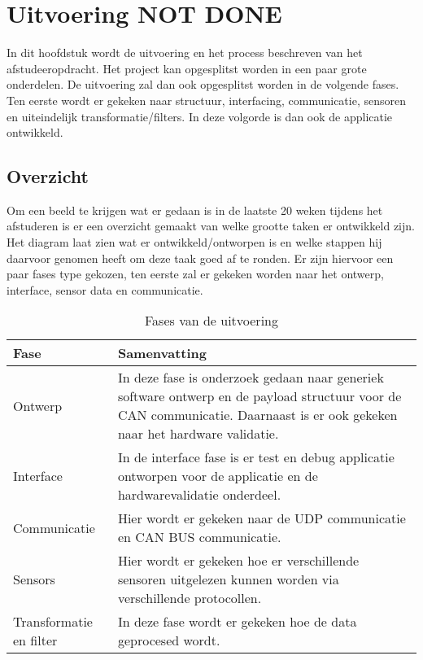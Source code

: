 \chapter{Uitvoering NOT DONE}
In dit hoofdstuk wordt de uitvoering en het process beschreven van het afstudeeropdracht. Het project kan opgesplitst worden in een paar grote onderdelen. De uitvoering zal dan ook opgesplitst worden in de volgende fases. Ten eerste wordt er gekeken naar structuur, interfacing, communicatie, sensoren en uiteindelijk transformatie/filters. In deze volgorde is dan ook de applicatie ontwikkeld.

\section{Overzicht}
Om een beeld te krijgen wat er gedaan is in de laatste 20 weken tijdens het afstuderen is er een overzicht gemaakt van welke grootte taken er ontwikkeld zijn. Het diagram laat zien wat er ontwikkeld/ontworpen is en welke stappen hij daarvoor genomen heeft om deze taak goed af te ronden. Er zijn hiervoor een paar fases type gekozen, ten eerste zal er gekeken worden naar het ontwerp, interface, sensor data en communicatie.

\begin{table}[h!]
	\centering
	\caption{Fases van de uitvoering}
	\label{tab:UitvoeringOverzicht}
	\begin{tabular}{lp{13cm}}
	\toprule
	\textbf{Fase} & \textbf{Samenvatting} \\ \midrule
	Ontwerp & In deze fase is onderzoek gedaan naar generiek software ontwerp en de payload structuur voor de CAN communicatie. Daarnaast is er ook gekeken naar het hardware validatie. \\
	Interface & In de interface fase is er test en debug applicatie ontworpen voor de applicatie en de hardwarevalidatie onderdeel. \\
	Communicatie & Hier wordt er gekeken naar de UDP communicatie en CAN BUS communicatie.                      \\
	Sensors  & Hier wordt er gekeken hoe er verschillende sensoren uitgelezen kunnen worden via verschillende protocollen.                      \\ 
	Transformatie en filter & In deze fase wordt er gekeken hoe de data geprocesed wordt. \\ \bottomrule
	\end{tabular}
\end{table}

